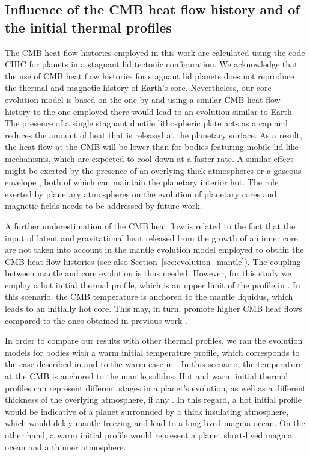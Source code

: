 \documentclass[draft]{agujournal2019} %
\begin{document}
\subsection{Influence of the CMB heat flow history and of the initial thermal profiles}

The CMB heat flow histories employed in this work are calculated using the code CHIC \cite{NOACK201740} for planets in a stagnant lid tectonic configuration. We acknowledge that the use of CMB heat flow histories for stagnant lid planets does not reproduce the thermal and magnetic history of Earth's core. Nevertheless, our core evolution model is based on the one by  and using a similar CMB heat flow history  to the one employed there would lead to an evolution similar to Earth. The presence of a single stagnant ductile lithospheric plate acts as a cap and reduces the amount of heat that is released at the planetary surface. As a result, the heat flow at the CMB will be lower than for bodies featuring mobile lid-like mechanisms, which are expected to cool down at a faster rate. A similar effect might be exerted by the presence of an overlying thick atmospheres or a gaseous envelope \cite{lopez2014understanding,weiss2014mass}, both of which can maintain the planetary interior hot. The role exerted by planetary atmospheres on the evolution of planetary cores and magnetic fields needs to be addressed by future work. 

A further underestimation of the CMB heat flow is related to the fact that the input of latent and gravitational heat released from the growth of an inner core are not taken into account in the mantle evolution model employed to obtain the CMB heat flow histories (see also Section~\ref{sec:evolution_mantle}). The coupling between mantle and core evolution is thus needed. However, for this study we employ a hot initial thermal profile, which is an upper limit of the profile in . In this scenario, the CMB temperature is anchored to the mantle liquidus, which leads to an initially hot core. This may, in turn, promote higher CMB heat flows compared to the ones obtained in previous work \cite{valencia_internal_2006,Tack13}.

In order to compare our results with other thermal profiles, we ran the evolution models for bodies with a warm initial temperature profile, which corresponds to the case described in  and to the warm case in . In this scenario, the temperature at the CMB is anchored to the mantle solidus. Hot and warm initial thermal profiles can represent different stages in a planet's evolution, as well as a different thickness of the overlying atmosphere, if any \cite{hamano2013emergence}. In this regard, a hot initial profile would be indicative of a planet surrounded by a thick insulating atmosphere, which would delay mantle freezing and lead to a long-lived magma ocean. On the other hand, a warm initial profile would represent a planet short-lived magma ocean and a thinner atmosphere.
\end{document}
